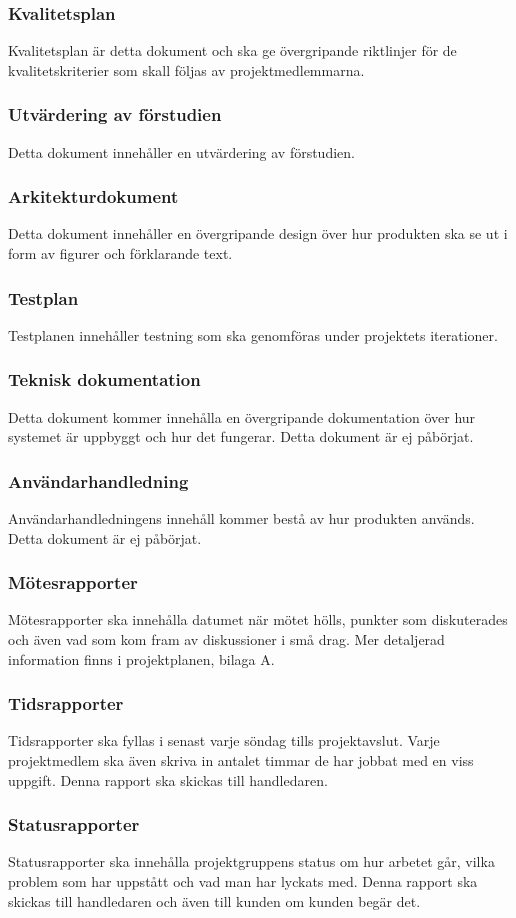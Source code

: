 \subsubsection{Kvalitetsplan}
Kvalitetsplan är detta dokument och ska ge övergripande riktlinjer för de kvalitetskriterier som skall följas av projektmedlemmarna.

\subsubsection{Utvärdering av förstudien}
Detta dokument innehåller en utvärdering av förstudien.

\subsubsection{Arkitekturdokument}
Detta dokument innehåller en övergripande design över hur produkten ska se ut i form av figurer och förklarande text.

\subsubsection{Testplan}
Testplanen innehåller testning som ska genomföras under projektets iterationer.

\subsubsection{Teknisk dokumentation}
Detta dokument kommer innehålla en övergripande dokumentation över hur systemet är uppbyggt och hur det fungerar. Detta dokument är ej påbörjat. 

\subsubsection{Användarhandledning}
Användarhandledningens innehåll kommer bestå av hur produkten används. Detta dokument är ej påbörjat.

\subsubsection{Mötesrapporter}
Mötesrapporter ska innehålla datumet när mötet hölls, punkter som diskuterades och även vad som kom fram av diskussioner i små drag. Mer detaljerad information finns i projektplanen, bilaga A.

\subsubsection{Tidsrapporter}
Tidsrapporter ska fyllas i senast varje söndag tills projektavslut. Varje projektmedlem ska även skriva in antalet timmar de har jobbat med en viss uppgift. Denna rapport ska skickas till handledaren.

\subsubsection{Statusrapporter}
Statusrapporter ska innehålla projektgruppens status om hur arbetet går, vilka problem som har uppstått och vad man har lyckats med. Denna rapport ska skickas till handledaren och även till kunden om kunden begär det. 
